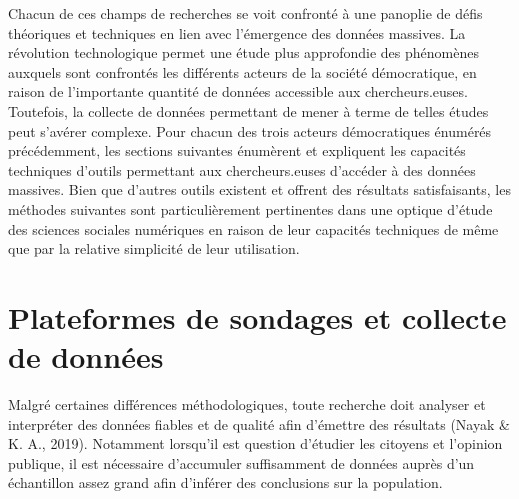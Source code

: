 \documentclass[
  letterpaper,
]{scrbook}
\begin{document}
Chacun de ces champs de recherches se voit confronté à une panoplie de
défis théoriques et techniques en lien avec l'émergence des données
massives. La révolution technologique permet une étude plus approfondie
des phénomènes auxquels sont confrontés les différents acteurs de la
société démocratique, en raison de l'importante quantité de données
accessible aux chercheurs.euses. Toutefois, la collecte de données
permettant de mener à terme de telles études peut s'avérer complexe.
Pour chacun des trois acteurs démocratiques énumérés précédemment, les
sections suivantes énumèrent et expliquent les capacités techniques
d'outils permettant aux chercheurs.euses d'accéder à des données
massives. Bien que d'autres outils existent et offrent des résultats
satisfaisants, les méthodes suivantes sont particulièrement pertinentes
dans une optique d'étude des sciences sociales numériques en raison de
leur capacités techniques de même que par la relative simplicité de leur
utilisation.

\hypertarget{plateformes-de-sondages-et-collecte-de-donnuxe9es}{%
\section{Plateformes de sondages et collecte de
données}\label{plateformes-de-sondages-et-collecte-de-donnuxe9es}}

Malgré certaines différences méthodologiques, toute recherche doit
analyser et interpréter des données fiables et de qualité afin d'émettre
des résultats (Nayak \& K. A., 2019). Notamment lorsqu'il est question
d'étudier les citoyens et l'opinion publique, il est nécessaire
d'accumuler suffisamment de données auprès d'un échantillon assez grand
afin d'inférer des conclusions sur la population.
\end{document}
